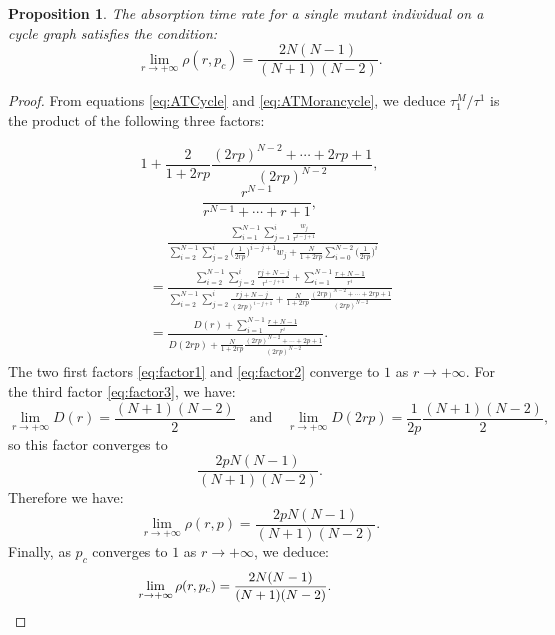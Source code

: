 \documentclass[a4paper,english,10pt]{amsart}
\newtheorem{proposition}{\bf Proposition}[section]
\theoremstyle{definition}
\numberwithin{equation}{section}
\begin{document}
\begin{proposition} \label{prop:AR_cycle}
The absorption time rate for a single mutant individual on a cycle graph satisfies the condition:  
$$
\lim_{r \to +\infty} \rho(r,p_c)  = \frac{2N(N-1)}{(N+1)(N-2)}.
$$
\end{proposition}

\begin{proof}   
 From equations \eqref{eq:ATCycle} and \eqref{eq:ATMorancycle}, we deduce $\tau_1^M/\tau^1$ is the product of the following three factors:

\begin{equation} \label{eq:factor1}
  1 + \frac{2}{1+2rp}  \frac{ (2rp)^{N-2} + \cdots + 2rp + 1}{ (2rp)^{N-2}},
\end{equation}
\begin{equation} \label{eq:factor2}
\frac{r^{N-1}}{ r^{N-1} + \cdots + r + 1},
\end{equation}
\begin{align} \label{eq:factor3}
\begin{split}
\phantom{O} & \phantom{=}
  \frac{\displaystyle 
   \sum_{i=1}^{N-1} \sum_{j=1}^i \frac{w_j}{r^{i-j+1}} }{\displaystyle \sum_{i=2}^{N-1} \sum_{j=2}^i \big(\frac{1}{2rp}\big)^{i-j+1}w_j + \frac{N}{1+2rp} \sum_{i=0}^{N-2} \big(\frac{1}{2rp}\big)^i} \\
    & = \frac{\displaystyle  
 \sum_{i=2}^{N-1} \sum_{j=2}^i \frac{rj+N-j}{r^{i-j+1}} + 
\sum_{i=1}^{N-1}  \frac{r+N-1}{r^i}
}{\displaystyle 
\sum_{i=2}^{N-1} \sum_{j=2}^i \frac{rj+N-j}{(2rp)^{i-j+1}} + \frac{N}{1+2rp} \frac{(2rp)^{N-2} + \cdots + 2rp + 1}{(2rp)^{N-2}}}  \\
&  = \frac{\displaystyle  D(r) + \sum_{i=1}^{N-1}  \frac{r+N-1}{r^i}}{\displaystyle D(2rp) + \frac{N}{1+2rp} \frac{(2rp)^{N-2} + \cdots + 2p + 1}{(2rp)^{N-2}}}. 
\end{split}
\end{align}
The two first factors \eqref{eq:factor1} and \eqref{eq:factor2} converge to $1$ as $r \to +\infty$. For the third factor \eqref{eq:factor3}, we have: $$
\lim_{r \to +\infty} D(r)= \frac{(N+1)(N-2)}{2}
\quad \text{and} \quad 
\lim_{r \to +\infty} D(2rp) = \frac{1}{2p} \frac{(N+1)(N-2)}{2}, 
$$
so this factor converges to 
$$
\frac{2pN(N-1)}{(N+1)(N-2)}.$$
Therefore we have:
$$
\lim_{r \to +\infty} \rho(r,p)  = \frac{2pN(N-1)}{(N+1)(N-2)}.
$$
Finally, as $p_c$ converges to $1$ as $r \to +\infty$, we deduce:
$$
 \hspace{1.35in} \lim_{r \to +\infty} \rho(r,p_c)  = \frac{2N(N-1)}{(N+1)(N-2)}. \hspace{1.87in} \qedhere
$$
\end{proof} 
\end{document}
